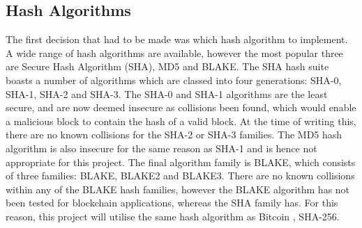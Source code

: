 \documentclass[a4paper, 11pt]{report}
\begin{document}
\subsection{Hash Algorithms} 
The first decision that had to be made was which hash algorithm to implement. A wide range of hash algorithms are available, however the most popular three are Secure Hash Algorithm (SHA), MD5 and BLAKE. The SHA hash suite boasts a number of algorithms which are classed into four generations: SHA-0, SHA-1, SHA-2 and SHA-3. The SHA-0 and SHA-1 algorithms are the least secure, and are now deemed insecure as collisions been found, which would enable a malicious block to contain the hash of a valid block. At the time of writing this, there are no known collisions for the SHA-2 or SHA-3 families. The MD5 hash algorithm is also insecure for the same reason as SHA-1 and is hence not appropriate for this project. The final algorithm family is BLAKE, which consists of three families: BLAKE, BLAKE2 and BLAKE3. There are no known collisions within any of the BLAKE hash families, however the BLAKE algorithm has not been tested for \gls{blockchain} applications, whereas the SHA family has. For this reason, this project will utilise the same hash algorithm as Bitcoin \cite{bitcoin}, SHA-256.
\end{document}
